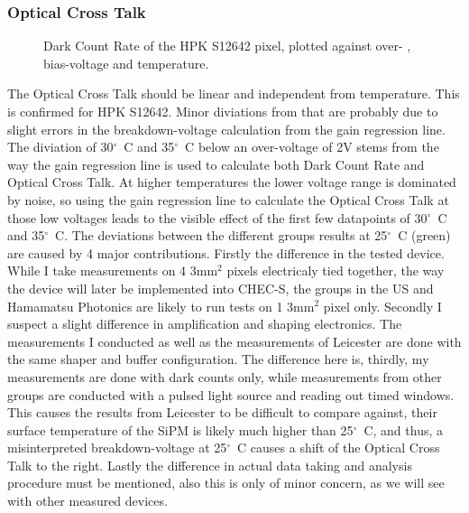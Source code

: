 \documentclass[12pt,article,type=msc,colorback,accentcolor=tud9c]{tudthesis}
\begin{document}
\subsubsection{Optical Cross Talk}
\begin{figure}[h]
\begin{centering}
\caption{Dark Count Rate of the HPK S12642 pixel, plotted against over- , bias-voltage and temperature.}
\label{fig:S12642_OCT}
\end{centering}
\end{figure}
The Optical Cross Talk should be linear and independent from temperature. This is confirmed for HPK S12642. Minor diviations from that are probably due to slight errors in the breakdown-voltage calculation from the gain regression line. The diviation of 30${^\circ}$~C and 35${^\circ}$~C below an over-voltage of 2V stems from the way the gain regression line is used to calculate both Dark Count Rate and Optical Cross Talk. At higher temperatures the lower voltage range is dominated by noise, so using the gain regression line to calculate the Optical Cross Talk at those low voltages leads to the visible effect of the first few datapoints of 30${^\circ}$~C and 35${^\circ}$~C. 
The deviations between the different groups results at 25${^\circ}$~C (green) are caused by 4 major contributions. Firstly the difference in the tested device. While I take measurements on 4 3mm$^2$ pixels electricaly tied together, the way the device will later be implemented into CHEC-S, the groups in the US and Hamamatsu Photonics are likely to run tests on 1 3mm$^2$ pixel only. Secondly I suspect a slight difference in amplification and shaping electronics. The measurements I conducted as well as the measurements of Leicester are done with the same shaper and buffer configuration. The difference here is, thirdly, my measurements are done with dark counts only, while measurements from other groups are conducted with a pulsed light source and reading out timed windows. This causes the results from Leicester to be difficult to compare against, their surface temperature of the SiPM is likely much higher than 25${^\circ}$~C, and thus, a misinterpreted breakdown-voltage at 25${^\circ}$~C causes a shift of the Optical Cross Talk to the right. Lastly the difference in actual data taking and analysis procedure must be mentioned, also this is only of minor concern, as we will see with other measured devices.
\end{document}
